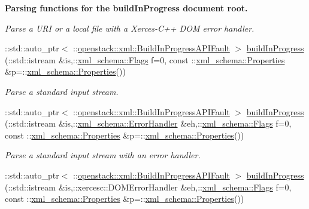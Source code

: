 \begin{Indent}{\bf Parsing functions for the buildInProgress document root.}
\begin{DoxyCompactItemize}
\begin{DoxyCompactList}\small\item\em Parse a URI or a local file with a Xerces-\/C++ DOM error handler. \item\end{DoxyCompactList}\item 
::std::auto\_\-ptr$<$ ::\hyperlink{classopenstack_1_1xml_1_1BuildInProgressAPIFault}{openstack::xml::BuildInProgressAPIFault} $>$ \hyperlink{namespaceopenstack_1_1xml_a10c6b209373d0ec008022290354bf808}{buildInProgress} (::std::istream \&is,::\hyperlink{namespacexml__schema_affb4c227cbd9aa7453dd1dc5a1401943}{xml\_\-schema::Flags} f=0, const ::\hyperlink{namespacexml__schema_ad27ce19a7ee1d3b1064092648898f64c}{xml\_\-schema::Properties} \&p=::\hyperlink{namespacexml__schema_ad27ce19a7ee1d3b1064092648898f64c}{xml\_\-schema::Properties}())
\begin{DoxyCompactList}\small\item\em Parse a standard input stream. \item\end{DoxyCompactList}\item 
::std::auto\_\-ptr$<$ ::\hyperlink{classopenstack_1_1xml_1_1BuildInProgressAPIFault}{openstack::xml::BuildInProgressAPIFault} $>$ \hyperlink{namespaceopenstack_1_1xml_ae8f6a9169ff626c1ff4526341ad97ea3}{buildInProgress} (::std::istream \&is,::\hyperlink{namespacexml__schema_ab1c9361bfd3b404eaabf0c31eded79dc}{xml\_\-schema::ErrorHandler} \&eh,::\hyperlink{namespacexml__schema_affb4c227cbd9aa7453dd1dc5a1401943}{xml\_\-schema::Flags} f=0, const ::\hyperlink{namespacexml__schema_ad27ce19a7ee1d3b1064092648898f64c}{xml\_\-schema::Properties} \&p=::\hyperlink{namespacexml__schema_ad27ce19a7ee1d3b1064092648898f64c}{xml\_\-schema::Properties}())
\begin{DoxyCompactList}\small\item\em Parse a standard input stream with an error handler. \item\end{DoxyCompactList}\item 
::std::auto\_\-ptr$<$ ::\hyperlink{classopenstack_1_1xml_1_1BuildInProgressAPIFault}{openstack::xml::BuildInProgressAPIFault} $>$ \hyperlink{namespaceopenstack_1_1xml_aed48946ddb2baad1e50772dfa162a08a}{buildInProgress} (::std::istream \&is,::xercesc::DOMErrorHandler \&eh,::\hyperlink{namespacexml__schema_affb4c227cbd9aa7453dd1dc5a1401943}{xml\_\-schema::Flags} f=0, const ::\hyperlink{namespacexml__schema_ad27ce19a7ee1d3b1064092648898f64c}{xml\_\-schema::Properties} \&p=::\hyperlink{namespacexml__schema_ad27ce19a7ee1d3b1064092648898f64c}{xml\_\-schema::Properties}())

\end{DoxyCompactItemize}
\end{Indent}
